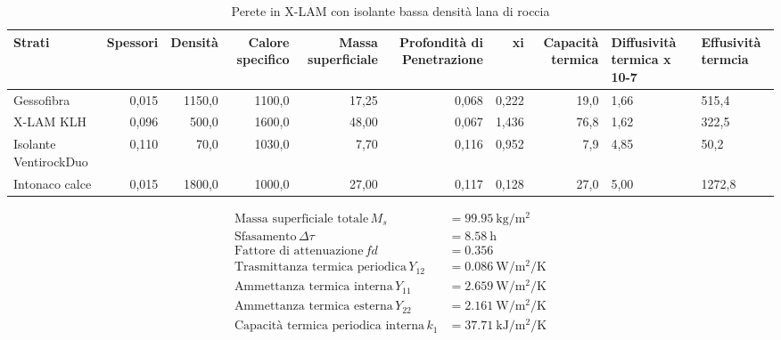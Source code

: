 \begin{table}
\centering
\caption{Perete in X-LAM con isolante bassa densità lana di roccia}
\begin{tabular}{lrrrrrrr}
\toprule
                Strati & Spessori & Densità & Calore specifico & Massa superficiale & Profondità di Penetrazione &     xi & Capacità termica & Diffusività termica x 10-7 & Effusività termcia \\
\midrule
            Gessofibra &    0,015 &  1150,0 &           1100,0 &              17,25 &                      0,068 &  0,222 &             19,0 &                       1,66 &              515,4 \\
             X-LAM KLH &    0,096 &   500,0 &           1600,0 &              48,00 &                      0,067 &  1,436 &             76,8 &                       1,62 &              322,5 \\
 Isolante VentirockDuo &    0,110 &    70,0 &           1030,0 &               7,70 &                      0,116 &  0,952 &              7,9 &                       4,85 &               50,2 \\
        Intonaco calce &    0,015 &  1800,0 &           1000,0 &              27,00 &                      0,117 &  0,128 &             27,0 &                       5,00 &             1272,8 \\
\bottomrule
\end{tabular}
\end{table}

\begin{flushleft}
\begin{align*}
\text{Massa superficiale totale} \, M_s &= \SI{99.95}{\kilo\gram\per\metre\squared}\\
\text{Sfasamento} \, \Delta\tau &= \SI{8.58}{\hour}\\
\text{Fattore di attenuazione} \, fd &= \SI{0.356}{}\\
\text{Trasmittanza termica periodica} \, Y_{12} &= \SI{0.086}{\watt\per\metre\squared\per\kelvin}\\
\text{Ammettanza termica interna} \, Y_{11} &= \SI{2.659}{\watt\per\metre\squared\per\kelvin}\\
\text{Ammettanza termica esterna} \, Y_{22} &= \SI{2.161}{\watt\per\metre\squared\per\kelvin}\\
\text{Capacità termica periodica interna} \, k_1 &= \SI{37.71}{\kilo\joule\per\metre\squared\per\kelvin}\\
\end{align*}
\end{flushleft}
